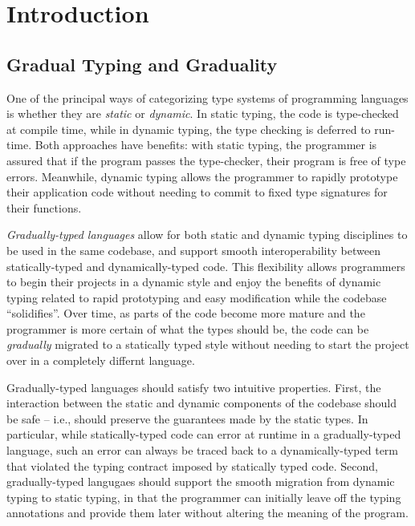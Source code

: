\section{Introduction}
  
\subsection{Gradual Typing and Graduality}
One of the principal ways of categorizing type systems of programming languages is
whether they are \emph{static} or \emph{dynamic}.
In static typing, the code is type-checked at compile time, while in dynamic typing,
the type checking is deferred to run-time. Both approaches have benefits: with static typing,
the programmer is assured that if the program passes the type-checker, their program
is free of type errors. Meanwhile, dynamic typing allows the programmer to rapidly prototype
their application code without needing to commit to fixed type signatures for their functions.

\emph{Gradually-typed languages} \cite{siek-taha06} allow for both static and dynamic typing disciplines
to be used in the same codebase, and support smooth interoperability between statically-typed
and dynamically-typed code.
This flexibility allows programmers to begin their projects in a dynamic style and
enjoy the benefits of dynamic typing related to rapid prototyping and easy modification
while the codebase ``solidifies''. Over time, as parts of the code become more mature
and the programmer is more certain of what the types should be, the code can be
\emph{gradually} migrated to a statically typed style without needing to start the project
over in a completely differnt language.

Gradually-typed languages should satisfy two intuitive properties.
First, the interaction between the static and dynamic components of the codebase
should be safe -- i.e., should preserve the guarantees made by the static types.
In particular, while statically-typed code can error at runtime in a gradually-typed language,
such an error can always be traced back to a dynamically-typed term that
violated the typing contract imposed by statically typed code.
Second, gradually-typed langugaes should support the smooth migration from dynamic typing
to static typing, in that the programmer can initially leave off the
typing annotations and provide them later without altering the meaning of the
program.


